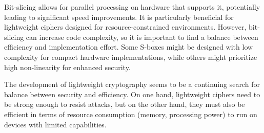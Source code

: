 \documentclass[conference]{IEEEtran}
\begin{document}
Bit-slicing allows for parallel processing on hardware that supports it, potentially leading to significant speed improvements. It is particularly beneficial for lightweight ciphers designed for resource-constrained environments. However, bit-slicing can increase code complexity, so it is important to find a balance between efficiency and implementation effort. Some S-boxes might be designed with low complexity for compact hardware implementations, while others might prioritize high non-linearity for enhanced security.

The development of lightweight cryptography seems to be a continuing search for balance between security and efficiency. On one hand, lightweight ciphers need to be strong enough to resist attacks, but on the other hand, they must also be efficient in terms of resource consumption (memory, processing power) to run on devices with limited capabilities.




\vspace{12pt}
\end{document}
